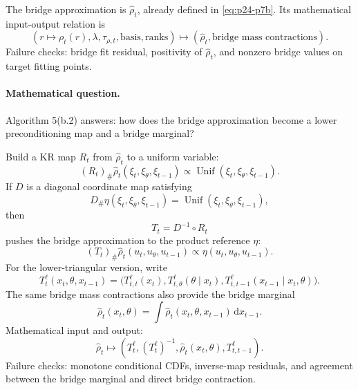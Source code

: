 \documentclass[11pt]{article}
\numberwithin{equation}{section}
\newcommand{\dd}{\,\mathrm d}
\begin{document}
The bridge approximation is \(\widehat\rho_t\), already defined in \eqref{eq:p24-p7b}.  Its
mathematical input-output relation is
\begin{equation}
    (r\mapsto \rho_t(r),\lambda,\tau_{\rho,t},\text{basis},\text{ranks})
    \mapsto
    (\widehat\rho_t,\text{bridge mass contractions}).
    \label{eq:p24-p7l}
\end{equation}
Failure checks: bridge fit residual, positivity of \(\widehat\rho_t\), and
nonzero bridge values on target fitting points.

\paragraph{Mathematical question.}
Algorithm 5(b.2) answers: how does the bridge approximation become a lower
preconditioning map and a bridge marginal?

Build a KR map \(R_t\) from \(\widehat\rho_t\) to a uniform variable:
\begin{equation}
    (R_t)_\#\widehat\rho_t(\xi_t,\xi_\theta,\xi_{t-1})
    \propto
    \operatorname{Unif}(\xi_t,\xi_\theta,\xi_{t-1}).
    \label{eq:p24-p8}
\end{equation}
If \(D\) is a diagonal coordinate map satisfying
\begin{equation}
    D_\#\eta(\xi_t,\xi_\theta,\xi_{t-1})
    =
    \operatorname{Unif}(\xi_t,\xi_\theta,\xi_{t-1}),
    \label{eq:p24-p9}
\end{equation}
then
\begin{equation}
    T_t=D^{-1}\circ R_t
    \label{eq:p24-p10}
\end{equation}
pushes the bridge approximation to the product reference \(\eta\):
\begin{equation}
    (T_t)_\#\widehat\rho_t(u_t,u_\theta,u_{t-1})
    \propto
    \eta(u_t,u_\theta,u_{t-1}).
    \label{eq:p24-p11}
\end{equation}
For the lower-triangular version, write
\begin{equation}
    T_t^{\ell}(x_t,\theta,x_{t-1})
    =
    \bigl(
    T_{t,t}^{\ell}(x_t),
    T_{t,\theta}^{\ell}(\theta\mid x_t),
    T_{t,t-1}^{\ell}(x_{t-1}\mid x_t,\theta)
    \bigr).
    \label{eq:p24-p11a}
\end{equation}
The same bridge mass contractions also provide the bridge marginal
\begin{equation}
    \widehat\rho_t(x_t,\theta)
    =
    \int\widehat\rho_t(x_t,\theta,x_{t-1})\dd x_{t-1}.
    \label{eq:p24-p11b}
\end{equation}
Mathematical input and output:
\begin{equation}
    \widehat\rho_t
    \mapsto
    (T_t^\ell,(T_t^\ell)^{-1},\widehat\rho_t(x_t,\theta),
    T_{t,t-1}^\ell).
    \label{eq:p24-p11c}
\end{equation}
Failure checks: monotone conditional CDFs, inverse-map residuals, and agreement
between the bridge marginal and direct bridge contraction.
\end{document}
